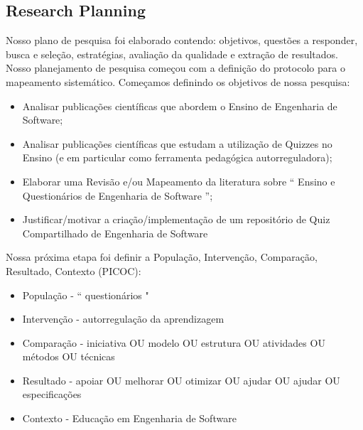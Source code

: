 \subsection{Research Planning}
\label{planeja}

Nosso plano de pesquisa foi elaborado contendo: objetivos, questões a responder, busca e seleção, estratégias, avaliação da qualidade e extração de resultados. Nosso planejamento de pesquisa começou com a definição do protocolo para o mapeamento sistemático. Começamos definindo os objetivos de nossa pesquisa:
\begin{itemize}
     \item Analisar publicações científicas que abordem o Ensino de Engenharia de Software;
     \item Analisar publicações científicas que estudam a utilização de Quizzes no Ensino (e em particular como ferramenta pedagógica autorreguladora);
     \item Elaborar uma Revisão e/ou Mapeamento da literatura sobre `` Ensino e Questionários de Engenharia de Software '';
     \item Justificar/motivar a criação/implementação de um repositório de Quiz Compartilhado de Engenharia de Software
\end{itemize}

Nossa próxima etapa foi definir a População, Intervenção, Comparação, Resultado, Contexto (PICOC):
\begin{itemize}
     \item População - `` questionários "
     \item Intervenção - autorregulação da aprendizagem
     \item Comparação - iniciativa OU modelo OU estrutura OU atividades OU métodos OU técnicas
     \item Resultado - apoiar OU melhorar OU otimizar OU ajudar OU ajudar OU especificações
     \item Contexto - Educação em Engenharia de Software
\end{itemize}

